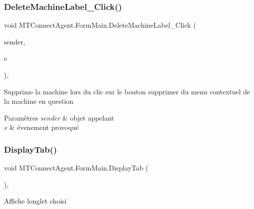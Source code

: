 \subsubsection{\texorpdfstring{Delete\+Machine\+Label\+\_\+\+Click()}{DeleteMachineLabel\_Click()}}
{\footnotesize\ttfamily void M\+T\+Connect\+Agent.\+Form\+Main.\+Delete\+Machine\+Label\+\_\+\+Click (\begin{DoxyParamCaption}\item[{object}]{sender,  }\item[{Event\+Args}]{e }\end{DoxyParamCaption})\hspace{0.3cm}{\ttfamily [inline]}, {\ttfamily [private]}}



Supprime la machine lors du clic sur le bouton supprimer du menu contextuel de la machine en question 


\begin{DoxyParams}{Paramètres}
{\em sender} & objet appelant\\
\hline
{\em e} & évenement provoqué\\
\hline
\end{DoxyParams}
\mbox{\label{class_m_t_connect_agent_1_1_form_main_aea0155e69bf10a220151c5f3ff4e07c8}} 
\subsubsection{\texorpdfstring{Display\+Tab()}{DisplayTab()}}
{\footnotesize\ttfamily void M\+T\+Connect\+Agent.\+Form\+Main.\+Display\+Tab (\begin{DoxyParamCaption}{ }\end{DoxyParamCaption})\hspace{0.3cm}{\ttfamily [inline]}, {\ttfamily [private]}}



Affiche l\textquotesingle{}onglet choisi 

\mbox{\label{class_m_t_connect_agent_1_1_form_main_a3d1ddf99b2318c689bd65eff1e863445}} 
